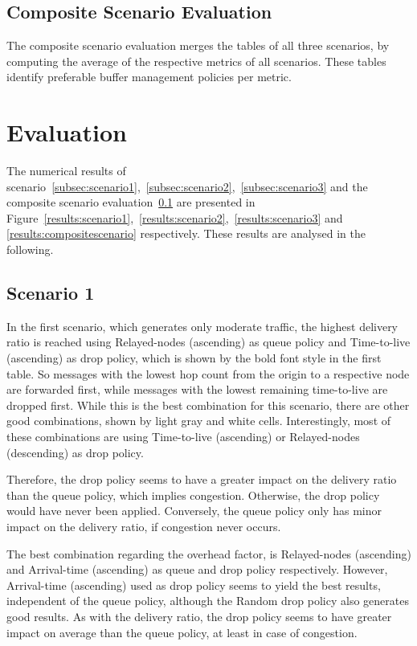 \documentclass[conference,10pt,letterpaper,final]{IEEEtran}
\begin{document}
\subsection{Composite Scenario Evaluation}
\label{subsec:compositescenario}
The composite scenario evaluation merges the tables of all three scenarios, 
by computing the average of the respective metrics of all scenarios.
These tables identify preferable buffer management policies per metric.
\vspace{0.2cm}



\section{Evaluation}
\label{sec:evaluation}
The numerical results of scenario~\ref{subsec:scenario1},~\ref{subsec:scenario2},~\ref{subsec:scenario3} and the composite scenario evaluation~\ref{subsec:compositescenario} are presented in Figure~\ref{results:scenario1},~\ref{results:scenario2},~\ref{results:scenario3} and \ref{results:compositescenario} respectively.
These results are analysed in the following.


\subsection{Scenario 1}
\label{subsec:evaluation:scenario1}
In the first scenario, which generates only moderate traffic, the highest delivery ratio is reached using Relayed-nodes (ascending) as queue policy and Time-to-live (ascending) as drop policy, which is shown by the bold font style in the first table.
So messages with the lowest hop count from the origin to a respective node are forwarded first, while messages with the lowest remaining time-to-live are dropped first.
While this is the best combination for this scenario, there are other good combinations, shown by light gray and white cells.
Interestingly, most of these combinations are using Time-to-live (ascending) or Relayed-nodes (descending) as drop policy.

Therefore, the drop policy seems to have a greater impact on the delivery ratio than the queue policy, which implies congestion.
Otherwise, the drop policy would have never been applied.
Conversely, the queue policy only has minor impact on the delivery ratio, if congestion never occurs.


The best combination regarding the overhead factor, is Relayed-nodes (ascending) and Arrival-time (ascending) as queue and drop policy respectively.
However, Arrival-time (ascending) used as drop policy seems to yield the best results, independent of the queue policy, although the Random drop policy also generates good results.
As with the delivery ratio, the drop policy seems to have greater impact on average than the queue policy, at least in case of congestion.
\end{document}
